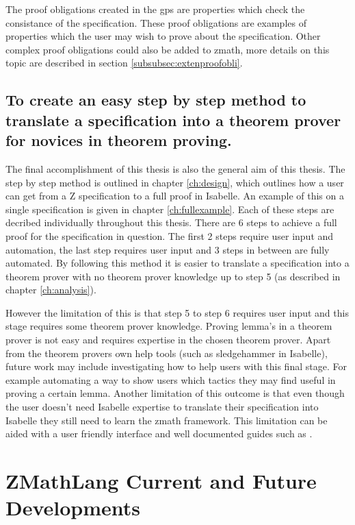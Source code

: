 The proof obligations created in the \gls{gps} are properties which check the consistance of the specification. These proof obligations are examples of properties which the user may wish to prove about the specification. Other complex proof obligations could also be added to \gls{zmath}, more details on this topic are described in section \ref{subsubsec:extenproofobli}.

\subsection{To create an easy step by step method to translate a specification into a theorem prover for novices in theorem proving.}

The final accomplishment of this thesis is also the general aim of this thesis. The step by step method is outlined in chapter \ref{ch:design}, which outlines how a user can get from a Z specification to a full proof in Isabelle. An example of this on a single specification is given in chapter \ref{ch:fullexample}. Each of these steps are decribed individually throughout this thesis. There are 6 steps to achieve a full proof for the specification in question. The first 2 steps require user input and automation, the last step requires user input and 3 steps in between are fully automated. By following this method it is easier to translate a specification into a theorem prover with no theorem prover knowledge up to step 5 (as described in chapter \ref{ch:analysis}).

However the limitation of this is that step 5 to step 6 requires user input and this stage requires some theorem prover knowledge. Proving lemma's in a theorem prover is not easy and requires expertise in the chosen theorem prover. Apart from the theorem provers own help tools (such as sledgehammer in Isabelle), future work may include investigating how to help users with this final stage. For example automating a way to show users which tactics they may find useful in proving a certain lemma. Another limitation of this outcome is that even though the user doesn't need Isabelle expertise to translate their specification into Isabelle they still need to learn the \gls{zmath} framework. This limitation can be aided with a user friendly interface and well documented guides such as \cite{zmathuser}.


\section{ZMathLang Current and Future Developments}
\label{sec:zmathcurandfut}

